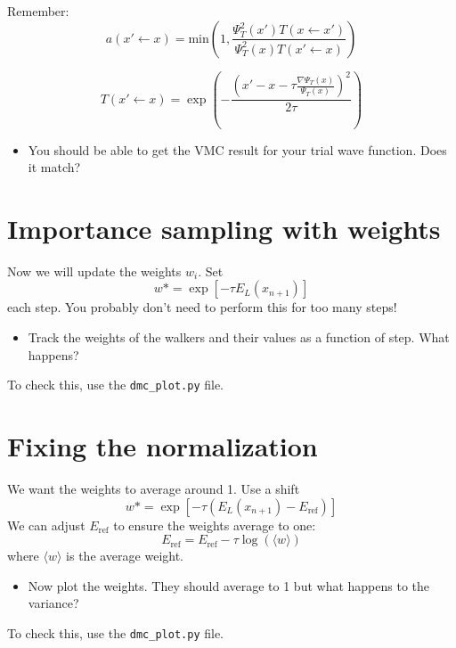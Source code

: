 \documentclass[12pt]{article}
\begin{document}
Remember:
\begin{equation}
	a(x' \leftarrow x) = \text{min}\left(1,\frac{\Psi_T^2(x') T(x \leftarrow x')}{\Psi_T^2(x) T(x' \leftarrow x)} \right)
\end{equation}

\begin{equation}
	T(x'\leftarrow x) = \exp\left(-\frac{ \left(x' - x - \tau \frac{\nabla \Psi_T(x)}{\Psi_T(x)}\right)^2}{ 2\tau}\right)
\end{equation}

\begin{itemize}
\item You should be able to get the VMC result for your trial wave function. Does it match? 
\end{itemize}

\section*{Importance sampling with weights}
Now we will update the weights $w_i$. Set 
\begin{equation}
w*=	\exp[-\tau E_L(x_{n+1})] 
\end{equation}
each step.
You probably don't need to perform this for too many steps!

\begin{itemize}
\item Track the weights of the walkers and their values as a function of step. What happens?
\end{itemize}
To check this, use the \texttt{dmc\_plot.py} file.


\section*{Fixing the normalization}

We want the weights to average around 1.
Use a shift 
\begin{equation}
w*=	\exp[-\tau (E_L(x_{n+1})-E_{\text{ref}})] 
\end{equation}
We can adjust $E_{\text {ref}}$ to ensure the weights average to one:
\begin{equation}
E_{\text{ref}}=E_{\text{ref}}-\tau \log(\langle w \rangle) 
\end{equation}
where $\langle w \rangle$ is the average weight. 

\begin{itemize}
\item Now plot the weights. They should average to 1 but what happens to the variance?
\end{itemize}
To check this, use the \texttt{dmc\_plot.py} file.
\end{document}
